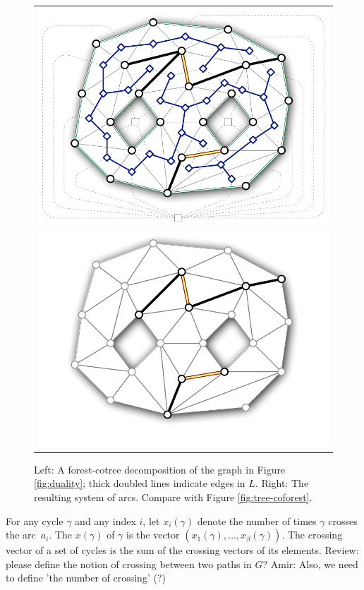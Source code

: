 \documentclass[letterpaper,review]{siamart190516}
\def\rnote#1{\color{red}Review: #1 \color{black}}
\begin{document}
\begin{figure}[htb]
\centering\footnotesize\sf
\begin{tabular}{c}
\includegraphics[scale=0.45]{Fig/forest-cotree2} \qquad
\includegraphics[scale=0.45]{Fig/forest-cotree-arcs2}
\end{tabular}
\caption{Left: A forest-cotree decomposition of the graph in Figure \ref{fig:duality}; thick doubled lines indicate edges in $L$.
Right: The resulting system of arcs.  Compare with Figure \ref{fig:tree-coforest}.}
\label{fig:forest-cotree}
\end{figure}

For any cycle $\gamma$ and any index $i$, let $x_i(\gamma)$ denote the number of times $\gamma$ crosses the arc~$a_i$.  The  $x(\gamma)$ of $\gamma$ is the vector $(x_1(\gamma), \dots, x_\beta(\gamma))$.  The crossing vector of a set of cycles is the sum of the crossing vectors of its elements. \rnote{please define the notion of crossing between two paths in $G$? Amir: Also, we need to define 'the number of crossing' (?)}
\end{document}
